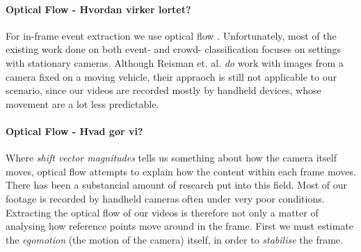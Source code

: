 \paragraph{Optical Flow - Hvordan virker lortet?}
%
For in-frame event extraction we use optical flow \cite{Bouguet2000}.
%
%
Unfortunately, most of the existing work done on both event- and crowd- classification focuses on settings with stationary cameras. Although Reisman et. al. \cite{CrowdDetectionInVideoSequences} \textit{do} work with images from a camera fixed on a moving vehicle, their appraoch is still not applicable to our scenario, since our videos are recorded mostly by handheld devices, whose movement are a lot less predictable.\\
%
\paragraph{Optical Flow - Hvad gør vi?}
%
Where \textit{shift vector magnitudes} tells us something about how the camera itself moves, optical flow attempts to explain how the content within each frame moves. There has been a substancial amount of research put into this field. Most of our footage is recorded by handheld cameras often under very poor conditions. Extracting the optical flow of our videos is therefore not only a matter of analysing how reference points move around in the frame. First we must estimate the \textit{egomotion} (the motion of the camera) itself, in order to \textit{stabilise} the frame.
%
